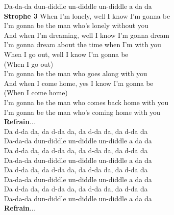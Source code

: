 \documentclass[twoside,8pt]{scrartcl}
\begin{document}
Da-da-da dun-diddle un-diddle un-diddle a da da\\
\clearpage
\textbf{Strophe 3}\newline
When I'm lonely, well I know I'm gonna be\\
I'm gonna be the man who's lonely without you\\
And when I'm dreaming, well I know I'm gonna dream\\
I'm gonna dream about the time when I'm with you\\
When I go out, well I know I'm gonna be\\
(When I go out)\\
I'm gonna be the man who goes along with you\\
And when I come home, yes I know I'm gonna be\\
(When I come home)\\
I'm gonna be the man who comes back home with you\\
I'm gonna be the man who's coming home with you\\
\newline
\textbf{Refrain}...\\
\newline
Da d-da da, da d-da da, da d-da da, da d-da da\\
Da-da-da dun-diddle un-diddle un-diddle a da da\\
Da d-da da, da d-da da, da d-da da, da d-da da\\
Da-da-da dun-diddle un-diddle un-diddle a da da\\
\newline
Da d-da da, da d-da da, da d-da da, da d-da da\\
Da-da-da dun-diddle un-diddle un-diddle a da da\\
Da d-da da, da d-da da, da d-da da, da d-da da\\
Da-da-da dun-diddle un-diddle un-diddle a da da\\
\newline
\textbf{Refrain}...\\
\clearpage
\end{document}
